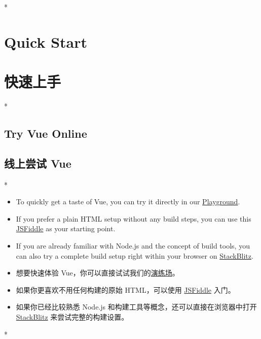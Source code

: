 \begin{paracol}{2}
\switchcolumn[0]*%
\section{Quick Start}
\switchcolumn
\section{快速上手}
\switchcolumn[0]*%
\subsection{Try Vue Online}
\switchcolumn
\subsection{线上尝试 Vue}
\switchcolumn[0]*%
\begin{itemize}
\item
    To quickly get a taste of Vue, you can try it directly in our
    \href{https://play.vuejs.org/\#eNo9jcEKwjAMhl/lt5fpQYfXUQfefAMvvRQbddC1pUuHUPrudg4HIcmXjyRZXEM4zYlEJ+T0iEPgXjn6BB8Zhp46WUZWDjCa9f6w9kAkTtH9CRinV4fmRtZ63H20Ztesqiylphqy3R5UYBqD1UyVAPk+9zkvV1CKbCv9poMLiTEfR2/IXpSoXomqZLtti/IFwVtA9A==}{Playground}.
\item
    If you prefer a plain HTML setup without any build steps, you can use
    this \href{https://jsfiddle.net/yyx990803/2ke1ab0z/}{JSFiddle} as your
    starting point.
\item
    If you are already familiar with Node.js and the concept of build
    tools, you can also try a complete build setup right within your
    browser on \href{https://vite.new/vue}{StackBlitz}.
\end{itemize}
\switchcolumn
\begin{itemize}
\item
    想要快速体验
    Vue，你可以直接试试我们的\href{https://play.vuejs.org/\#eNo9jcEKwjAMhl/lt5fpQYfXUQfefAMvvRQbddC1pUuHUPrudg4HIcmXjyRZXEM4zYlEJ+T0iEPgXjn6BB8Zhp46WUZWDjCa9f6w9kAkTtH9CRinV4fmRtZ63H20Ztesqiylphqy3R5UYBqD1UyVAPk+9zkvV1CKbCv9poMLiTEfR2/IXpSoXomqZLtti/IFwVtA9A==}{演练场}。
\item
    如果你更喜欢不用任何构建的原始 HTML，可以使用
    \href{https://jsfiddle.net/yyx990803/2ke1ab0z/}{JSFiddle} 入门。
\item
    如果你已经比较熟悉 Node.js 和构建工具等概念，还可以直接在浏览器中打开
    \href{https://vite.new/vue}{StackBlitz} 来尝试完整的构建设置。
\end{itemize}
\switchcolumn[0]*%

\end{paracol}
